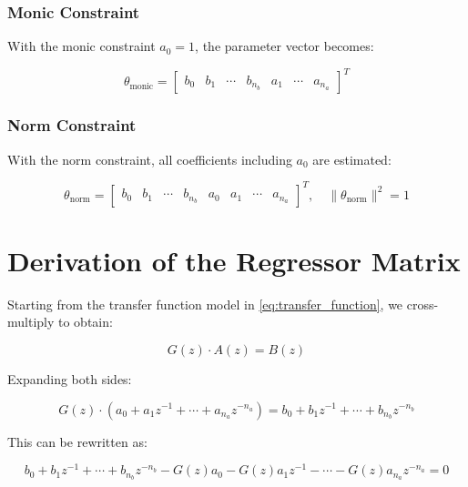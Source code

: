\subsubsection{Monic Constraint}

With the monic constraint $a_0 = 1$, the parameter vector becomes:

\begin{equation}
    \theta_{\text{monic}} = \begin{bmatrix} b_0 & b_1 & \cdots & b_{n_b} & a_1 & \cdots & a_{n_a} \end{bmatrix}^T
\end{equation}

\subsubsection{Norm Constraint}

With the norm constraint, all coefficients including $a_0$ are estimated:

\begin{equation}
    \theta_{\text{norm}} = \begin{bmatrix} b_0 & b_1 & \cdots & b_{n_b} & a_0 & a_1 & \cdots & a_{n_a} \end{bmatrix}^T, \quad \|\theta_{\text{norm}}\|^2 = 1
\end{equation}

\section{Derivation of the Regressor Matrix}

Starting from the transfer function model in \eqref{eq:transfer_function}, we cross-multiply to obtain:

\begin{equation}
    G(z) \cdot A(z) = B(z)
\end{equation}

Expanding both sides:

\begin{equation}
    G(z) \cdot \left(a_0 + a_1 z^{-1} + \cdots + a_{n_a} z^{-n_a}\right) = b_0 + b_1 z^{-1} + \cdots + b_{n_b} z^{-n_b}
\end{equation}

This can be rewritten as:

\begin{equation}
    b_0 + b_1 z^{-1} + \cdots + b_{n_b} z^{-n_b} - G(z) a_0 - G(z) a_1 z^{-1} - \cdots - G(z) a_{n_a} z^{-n_a} = 0
\end{equation}


